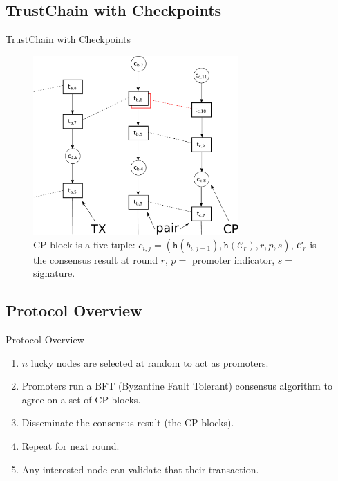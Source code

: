 \documentclass{beamer}
\begin{document}
\subsection{TrustChain with Checkpoints}
\begin{frame}{TrustChain with Checkpoints}

  \begin{figure}[h]
  \includegraphics[width=0.7\textwidth]{figures/trustchain-bad-cp}
  \centering
  \caption{CP block is a five-tuple: $c_{i,j} = (\texttt{h}(b_{i,j-1}),
    \texttt{h}(\mathcal{C}_r), r, p, s)$, $\mathcal{C}_r$ is the consensus
    result at round $r$, $p =$ promoter indicator, $s =$ signature.}
  \end{figure}

\end{frame}

\subsection{Protocol Overview}
\begin{frame}{Protocol Overview}
  \begin{enumerate}
    \item $n$ lucky nodes are selected at random to act as promoters.
    \item Promoters run a BFT (Byzantine Fault Tolerant) consensus algorithm to
      agree on a set of CP blocks.
    \item Disseminate the consensus result (the CP blocks).
    \item Repeat for next round.
    \item Any interested node can validate that their transaction.
  \end{enumerate}
\end{frame}
\end{document}

